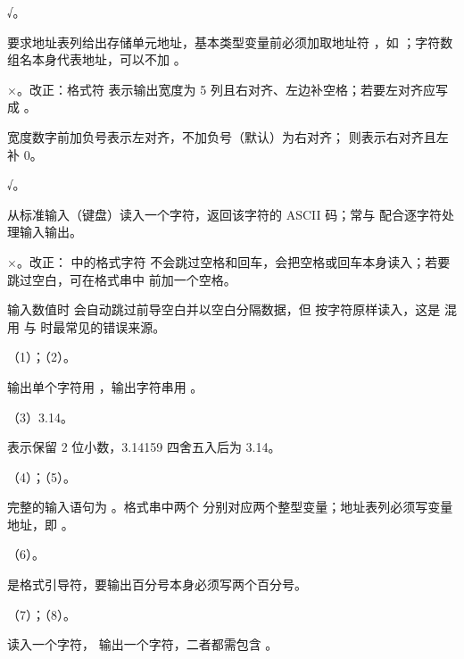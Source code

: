 \documentclass[a4paper,11pt]{article}
\begin{document}
\q √。\begin{analysis} 要求地址表列给出存储单元地址，基本类型变量前必须加取地址符 \code{\&}，如 ；字符数组名本身代表地址，可以不加 \code{\&}。\end{analysis}

\q ×。改正：格式符  表示输出宽度为 5 列且右对齐、左边补空格；若要左对齐应写成 。\begin{analysis}宽度数字前加负号表示左对齐，不加负号（默认）为右对齐； 则表示右对齐且左补 0。\end{analysis}

\q √。\begin{analysis} 从标准输入（键盘）读入一个字符，返回该字符的 ASCII 码；常与  配合逐字符处理输入输出。\end{analysis}

\q ×。改正： 中的格式字符  不会跳过空格和回车，会把空格或回车本身读入；若要跳过空白，可在格式串中  前加一个空格。\begin{analysis}输入数值时  会自动跳过前导空白并以空白分隔数据，但  按字符原样读入，这是  混用  与  时最常见的错误来源。\end{analysis}


\q （1）；（2）。\begin{analysis}输出单个字符用 ，输出字符串用 。\end{analysis}

\q （3）3.14。\begin{analysis} 表示保留 2 位小数，3.14159 四舍五入后为 3.14。\end{analysis}

\q （4）；（5）。\begin{analysis}完整的输入语句为 。格式串中两个  分别对应两个整型变量；地址表列必须写变量地址，即 。\end{analysis}

\q （6）\code{\%\%}。\begin{analysis}\code{\%} 是格式引导符，要输出百分号本身必须写两个百分号。\end{analysis}

\q （7）；（8）。\begin{analysis} 读入一个字符， 输出一个字符，二者都需包含 。\end{analysis}
\end{document}
